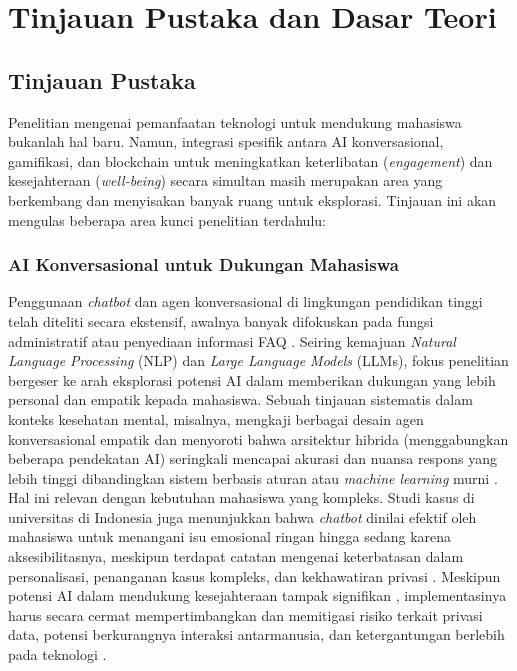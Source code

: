 \chapter{Tinjauan Pustaka dan Dasar Teori}
\label{ch:tinjpust_dasar_teori}

\section{Tinjauan Pustaka}
\label{sec:tinjauan_pustaka}

\noindent Penelitian mengenai pemanfaatan teknologi untuk mendukung mahasiswa bukanlah hal baru. Namun, integrasi spesifik antara AI konversasional, gamifikasi, dan blockchain untuk meningkatkan keterlibatan (\textit{engagement}) dan kesejahteraan (\textit{well-being}) secara simultan masih merupakan area yang berkembang dan menyisakan banyak ruang untuk eksplorasi. Tinjauan ini akan mengulas beberapa area kunci penelitian terdahulu:

\subsection{AI Konversasional untuk Dukungan Mahasiswa} 
\label{subsec:ai_konversasional}

\noindent Penggunaan \textit{chatbot} dan agen konversasional di lingkungan pendidikan tinggi telah diteliti secara ekstensif, awalnya banyak difokuskan pada fungsi administratif atau penyediaan informasi FAQ \cite{ai_chatbots_education_advances_2024}. Seiring kemajuan \textit{Natural Language Processing} (NLP) dan \textit{Large Language Models} (LLMs), fokus penelitian bergeser ke arah eksplorasi potensi AI dalam memberikan dukungan yang lebih personal dan empatik kepada mahasiswa. Sebuah tinjauan sistematis dalam konteks kesehatan mental, misalnya, mengkaji berbagai desain agen konversasional empatik dan menyoroti bahwa arsitektur hibrida (menggabungkan beberapa pendekatan AI) seringkali mencapai akurasi dan nuansa respons yang lebih tinggi dibandingkan sistem berbasis aturan atau \textit{machine learning} murni \cite{empathetic_conversational_agents_mental_health_2024}. Hal ini relevan dengan kebutuhan mahasiswa yang kompleks. Studi kasus di universitas di Indonesia juga menunjukkan bahwa \textit{chatbot} dinilai efektif oleh mahasiswa untuk menangani isu emosional ringan hingga sedang karena aksesibilitasnya, meskipun terdapat catatan mengenai keterbatasan dalam personalisasi, penanganan kasus kompleks, dan kekhawatiran privasi \cite{chatbot_student_mental_health_unuja}. Meskipun potensi AI dalam mendukung kesejahteraan tampak signifikan \cite{ai_effects_student_wellbeing_2025}, implementasinya harus secara cermat mempertimbangkan dan memitigasi risiko terkait privasi data, potensi berkurangnya interaksi antarmanusia, dan ketergantungan berlebih pada teknologi \cite{ai_effects_student_wellbeing_2025, empathetic_conversational_agents_mental_health_2024}.

